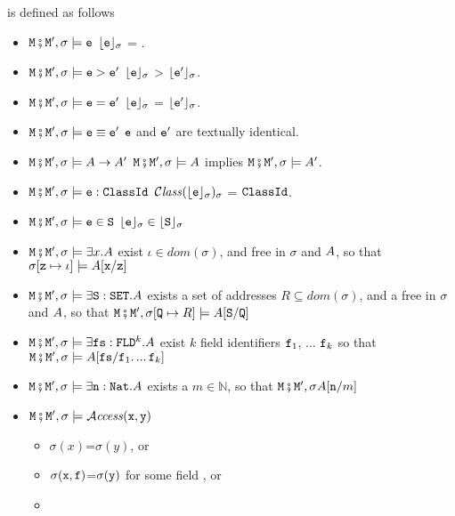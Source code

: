 \begin{definition} is defined  as follows

\begin{itemize}
\item
$\M\mkpair \M', \sigma \models\SE$ \IFF  $\interp{\SE}{\sigma}$ = .
\item
$\M\mkpair \M', \sigma \models\SE>\SEPrime$ \IFF $\interp{\SE}{\sigma}$ > $\interp{\SEPrime}{\sigma}$.
\item
$\M\mkpair \M', \sigma \models\SE=\SEPrime$ \IFF $\interp{\SE}{\sigma}$ = $\interp{\SEPrime}{\sigma}$.
\item
$\M\mkpair \M', \sigma \models\SE\equiv\SEPrime$ \IFF $\SE$ and $\SEPrime$ are textually identical.
\item
$\M\mkpair \M', \sigma \models\A \rightarrow \A' $ \IFF $\M\mkpair \M', \sigma \models\A$ implies $\M\mkpair \M', \sigma \models\A'$. 
\item
$\M\mkpair \M', \sigma \models \SE:\prg{ClassId}$ \IFF $\ClassOf {\interp{\SE}{\sigma}} {\sigma}$ = $\prg{ClassId}$.
\item
$\M\mkpair \M', \sigma \models \SE\in \prg{S}$ \IFF $\interp{\SE}{\sigma}\in \interp{\prg{S}}{\sigma}$
\item
$\M\mkpair \M', \sigma \models \exists x.\A$ \IFF  exist  $\iota\in dom(\sigma)$, and    free in $\sigma$ and $\A$, so that
$\sigma[\prg{z}\mapsto \iota] \models  \A[\prg{x}/\prg{z}]$ 
\item
$\M\mkpair \M', \sigma \models \exists \prg{S}:\prg{SET}.\A$ \IFF  exists a set of addresses $R\subseteq dom(\sigma)$, and a  free in $\sigma$ and $\A$, so that
$\M\mkpair \M', \sigma[\prg{Q}\mapsto R] \models  \A[\prg{S}/\prg{Q}]$ 
\item
$\M\mkpair \M', \sigma \models  \exists \prg{fs}:\prg{FLD}^k.\A$ \IFF  exist $k$ field identifiers $\prg{f}_1$, ... $\prg{f}_k$ so that 
$\M\mkpair \M', \sigma \models  \A[\prg{fs}/\prg{f}_1.\,...\,\prg{f}_k]$ 
\item
$\M\mkpair \M', \sigma \models  \exists \prg{n}:\prg{Nat}.\A$ \IFF  exists a $m\in\mathbb{N}$, so that $\M\mkpair \M', \sigma \A[\prg{n}/m]$ 
\item
$\M\mkpair \M', \sigma \models  \CanAccess{\prg{x}}{\prg{y}}$   \IFF  \begin{itemize}
\item
$\sigma(x)$=$\sigma(y)$, or
\item
$\sigma(\prg{x},\prg{f})$=$\sigma(\prg{y})$  for some field ,  or
\item

\end{itemize}
\end{itemize}
\end{definition}
